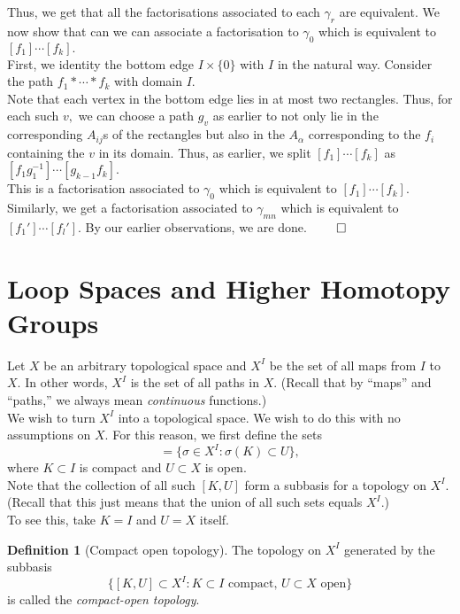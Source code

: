 \documentclass[12pt]{article}
\theoremstyle{definition}
\numberwithin{thm}{section}
\newtheorem{defn}[thm]{Definition}
\begin{document}
	Thus, we get that all the factorisations associated to each $\gamma_r$ are equivalent. We now show that can we can associate a factorisation to $\gamma_0$ which is equivalent to $[f_1]\cdots[f_k].$\\
	First, we identity the bottom edge $I\times\{0\}$ with $I$ in the natural way. Consider the path $f_1*\cdots*f_k$ with domain $I.$\\
	Note that each vertex in the bottom edge lies in at most two rectangles. Thus, for each such $v,$ we can choose a path $g_v$ as earlier to not only lie in the corresponding $A_{ij}$s of the rectangles but also in the $A_\alpha$ corresponding to the $f_i$ containing the $v$ in its domain. Thus, as earlier, we split $[f_1]\cdots[f_k]$ as $[f_1g_1^{-1}]\cdots[g_{k-1}f_k].$\\
	This is a factorisation associated to $\gamma_0$ which is equivalent to $[f_1]\cdots[f_k].$\\
	Similarly, we get a factorisation associated to $\gamma_{mn}$ which is equivalent to $\allowbreak[f_1']\cdots[f_l'].$ By our earlier observations, we are done. \hfill $\qed$

%
%
%
%

\section{Loop Spaces and Higher Homotopy Groups}
Let $X$ be an arbitrary topological space and $X^I$ be the set of all maps from $I$ to $X.$ In other words, $X^I$ is the set of all paths in $X.$ (Recall that by ``maps'' and ``paths,'' we always mean \emph{continuous} functions.)\\
We wish to turn $X^I$ into a topological space. We wish to do this with no assumptions on $X.$ For this reason, we first define the sets
\begin{equation*} 
	[K, U] = \{\sigma \in X^I : \sigma(K) \subset U\},
\end{equation*}
where $K \subset I$ is compact and $U \subset X$ is open.\\
Note that the collection of all such $[K, U]$ form a subbasis for a topology on $X^I.$ (Recall that this just means that the union of all such sets equals $X^I.$)\\
To see this, take $K = I$ and $U = X$ itself.

\begin{defn}[Compact open topology]
	The topology on $X^I$ generated by the subbasis
	\begin{equation*} 
		\{[K, U]\subset X^I : K \subset I \text{ compact, } U \subset X \text{ open}\}
	\end{equation*}
	is called the \emph{compact-open topology}.
\end{defn}
\end{document}
